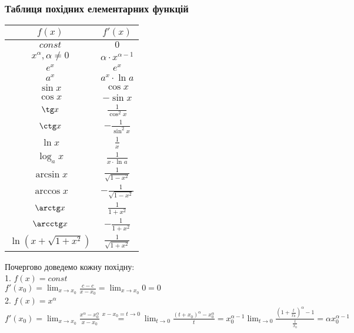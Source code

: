 \documentclass[a4paper, 14pt]{article}
\def\huge{\displaystyle}
\theoremstyle{theoremdd}
\theoremstyle{theoremdd}
\theoremstyle{theoremdd}
\theoremstyle{theoremdd}
\theoremstyle{theoremdd}
\theoremstyle{theoremdd}
\theoremstyle{theoremdd}
\theoremstyle{theoremdd}
\begin{document}
\subsubsection*{Таблиця похідних елементарних функцій}
\begin{center}
\begin{tabular}{ c|c } 
 $f(x)$ & $f'(x)$ \\
 \hline 
 $const$ & $0$ \\ [2ex]
 \hline 
 $x^\alpha, \alpha \neq 0$ & $\alpha \cdot x^{\alpha-1}$ \\ [2ex]
 \hline 
 $e^x$ & $e^x$ \\ [2ex]
 \hline 
 $a^x$ & $a^x \cdot \ln a$ \\ [2ex]
 \hline 
 $\sin x$ & $\cos x$\\ [2ex]
 \hline 
 $\cos x$ & $-\sin x$\\ [2ex]
 \hline 
 $\tg x$ & $\huge \frac{1}{\cos^2 x}$\\ [2ex]
 \hline 
 $\ctg x$ & $-\huge \frac{1}{\sin^2 x}$\\ [2ex]
 \hline 
 $\ln x$ & $\huge \frac{1}{x}$\\ [2ex]
 \hline 
 $\log_a x$ & $\huge \frac{1}{x \cdot \ln a}$\\ [2ex]
 \hline 
 $\arcsin x$ & $\huge \frac{1}{\sqrt{1-x^2}}$\\ [2ex]
 \hline 
 $\arccos x$ & $\huge -\frac{1}{\sqrt{1-x^2}}$\\ [2ex]
 \hline 
 $\arctg x$ & $\huge \frac{1}{1+x^2}$\\ [2ex]
 \hline 
 $\arcctg x$ & $\huge -\frac{1}{1+x^2}$\\ [2ex]
 \hline 
 $\ln(x+\sqrt{1+x^2})$ & $\huge \frac{1}{\sqrt{1+x^2}}$\\ [2ex]
 \hline 
\end{tabular}
\end{center}

Почергово доведемо кожну похідну:\\
1. $f(x) = const$\\
$f'(x_0) = \huge \lim_{x \to x_0} \frac{c-c}{x-x_0} = \lim_{x \to x_0} 0 = 0$
\bigskip \\

2. $f(x) = x^{\alpha}$\\
$f'(x_0) = \huge \lim_{x \to x_0} \frac{x^{\alpha} - x_0^{\alpha}}{x-x_0} \overset{x-x_0 = t \to 0}{=} \lim_{t \to 0} \frac{(t+x_0)^{\alpha} - x_0^{\alpha}}{t} = x_0^{\alpha-1} \lim_{t \to 0} \frac{\left(1 + \frac{t}{x_0}\right)^{\alpha} - 1}{\frac{t}{x_0}} = \alpha x_0^{\alpha-1}$
\bigskip \\
\end{document}
